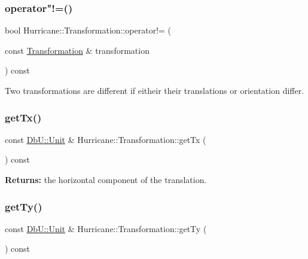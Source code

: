 \subsubsection{\texorpdfstring{operator"!=()}{operator!=()}}
{\footnotesize\ttfamily bool Hurricane\+::\+Transformation\+::operator!= (\begin{DoxyParamCaption}\item[{const \mbox{\hyperlink{classHurricane_1_1Transformation}{Transformation}} \&}]{transformation }\end{DoxyParamCaption}) const}

Two transformations are different if eitheir their translations or orientation differ. \mbox{\label{classHurricane_1_1Transformation_a08e8c1f23a73fcd1eb111c65695e848a}} 
\subsubsection{\texorpdfstring{get\+Tx()}{getTx()}}
{\footnotesize\ttfamily const \mbox{\hyperlink{group__DbUGroup_ga4fbfa3e8c89347af76c9628ea06c4146}{Db\+U\+::\+Unit}} \& Hurricane\+::\+Transformation\+::get\+Tx (\begin{DoxyParamCaption}{ }\end{DoxyParamCaption}) const\hspace{0.3cm}{\ttfamily [inline]}}

{\bfseries Returns\+:} the horizontal component of the translation. \mbox{\label{classHurricane_1_1Transformation_a0915bbf45c26ae91662653ce394ee203}} 
\subsubsection{\texorpdfstring{get\+Ty()}{getTy()}}
{\footnotesize\ttfamily const \mbox{\hyperlink{group__DbUGroup_ga4fbfa3e8c89347af76c9628ea06c4146}{Db\+U\+::\+Unit}} \& Hurricane\+::\+Transformation\+::get\+Ty (\begin{DoxyParamCaption}{ }\end{DoxyParamCaption}) const\hspace{0.3cm}{\ttfamily [inline]}}

